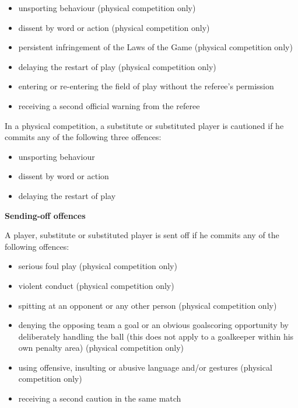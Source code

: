 \begin{itemize}
\item unsporting behaviour (physical competition only)
\item dissent by word or action (physical competition only)
\item persistent infringement of the Laws of the Game (physical competition only)
\item delaying the restart of play (physical competition only)
\item entering or re-entering the field of play without the referee's permission
\item receiving a second official warning from the referee
\end{itemize}

\bigskip

In a physical competition, a substitute or substituted player is cautioned if he commits any of the following three offences:

\begin{itemize}
\item unsporting behaviour
\item dissent by word or action
\item delaying the restart of play
\end{itemize}



{\bfseries Sending-off offences}

\headlinebox

A player, substitute or substituted player is sent off if he commits any of the following offences:

\begin{itemize}
\item serious foul play (physical competition only)
\item violent conduct (physical competition only)
\item spitting at an opponent or any other person (physical competition only)
\item denying the opposing team a goal or an obvious goalscoring opportunity by deliberately handling the ball (this does not apply to a goalkeeper within his own penalty area) (physical competition only)
\item using offensive, insulting or abusive language and/or gestures (physical competition only)
\item receiving a second caution in the same match
\end{itemize}

